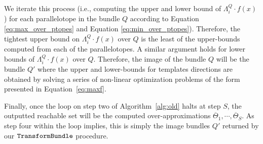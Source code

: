 We iterate this process (i.e., computing the upper and lower bound of $\Lambda^Q_{i}\cdot f(x)$) for each parallelotope in the bundle $Q$ according to Equation \ref{eq:max_over_ptopes} and Equation \ref{eq:min_over_ptopes}).
%
%
Therefore, the tightest upper bound on $\Lambda^Q_{i}\cdot f(x)$ over $Q$ is the least of the upper-bounds computed from each of the parallelotopes.
%
A similar argument holds for lower bounds of $\Lambda^Q_{i}\cdot f(x)$ over $Q$.
%
%
Therefore, the image of the bundle $Q$ will be the bundle $Q'$ where the upper and lower-bounds for templates directions are obtained by solving a series of non-linear optimization problems of the form presented in Equation~\ref{eq:maxf}.


Finally, once the loop on step two of Algorithm~\ref{alg:old} halts at step $S$, the outputted reachable set will be the computed over-approximations $\overline\Theta_1, \cdots, \overline\Theta_S$. As step four within the loop implies, this is simply the image bundles $Q'$ returned by our $\texttt{TransformBundle}$ procedure.

\def \reachplotwidth {1.3}

